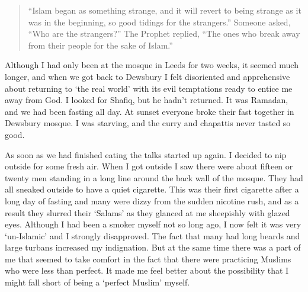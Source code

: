 \documentclass[12pt]{memoir}
\newcommand{\cor}[2]{#2} %
\begin{document}
\begin{quote}
“Islam began as something strange,
and it will revert to being strange as it was in the beginning,
so good tidings for the strangers.”
Someone asked, “Who are the strangers?”
The Prophet replied,
“The ones who break away from their people for the sake of Islam.”
\end{quote}

Although I had only been at the mosque in Leeds for two weeks,
it seemed much longer, and when we got back to Dewsbury I felt disoriented
and apprehensive about returning to ‘the real world’
with its evil temptations ready to entice me away from God.
I looked for Shafiq, but he hadn’t returned.
It was \cor{during}{} Ramadan, %
and we had been fasting all day.
At sunset everyone broke their fast together in Dewsbury mosque.
I was starving, and the curry and chapattis never tasted so good.

As soon as we had finished eating the talks started up again.
I decided to nip outside for some fresh air.
When I got outside I saw there were about fifteen or twenty men
standing in a long line around the back wall of the mosque.
They had all sneaked outside to have a quiet cigarette.
This was their first cigarette after a long day of fasting
and many were dizzy from the sudden nicotine rush,
and as a result they slurred their ‘Salams’
as they glanced at me sheepishly with glazed eyes.
Although I had been a smoker myself not so long ago,
I now felt it was very ‘un-Islamic’ and I strongly disapproved.
The fact that many had long beards and large turbans increased my indignation.
But at the same time there was a part of me that seemed to take comfort
in the fact that there were practicing Muslims who were less than perfect.
It made me feel better about the possibility
that I might fall short of being a ‘perfect Muslim’ myself.
\end{document}

